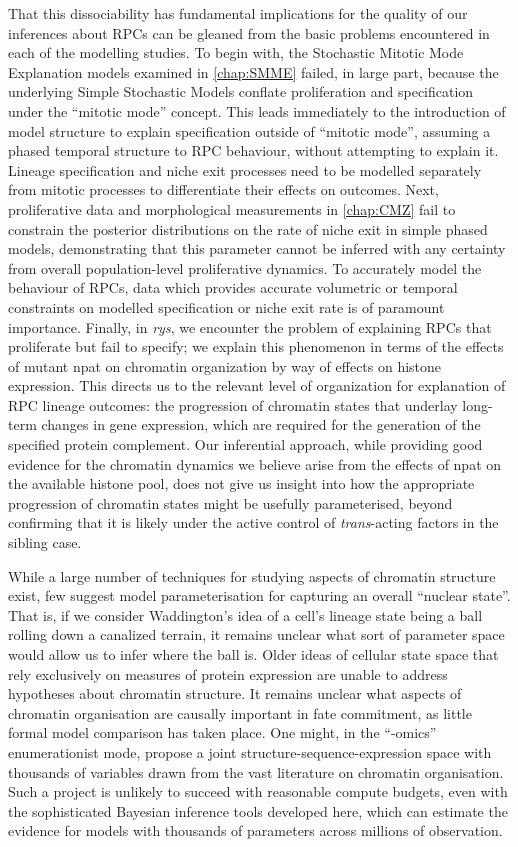 That this dissociability has fundamental implications for the quality of our inferences about RPCs can be gleaned from the basic problems encountered in each of the modelling studies. To begin with, the Stochastic Mitotic Mode Explanation models examined in \autoref{chap:SMME} failed, in large part, because the underlying Simple Stochastic Models conflate proliferation and specification under the ``mitotic mode'' concept. This leads immediately to the introduction of model structure to explain specification outside of ``mitotic mode'', assuming a phased temporal structure to RPC behaviour, without attempting to explain it. Lineage specification and niche exit processes need to be modelled separately from mitotic processes to differentiate their effects on outcomes. Next, proliferative data and morphological measurements in \autoref{chap:CMZ} fail to constrain the posterior distributions on the rate of niche exit in simple phased models, demonstrating that this parameter cannot be inferred with any certainty from overall population-level proliferative dynamics. To accurately model the behaviour of RPCs, data which provides accurate volumetric or temporal constraints on modelled specification or niche exit rate is of paramount importance. Finally, in \textit{rys}, we encounter the problem of explaining RPCs that proliferate but fail to specify; we explain this phenomenon in terms of the effects of mutant npat on chromatin organization by way of effects on histone expression. This directs us to the relevant level of organization for explanation of RPC lineage outcomes: the progression of chromatin states that underlay long-term changes in gene expression, which are required for the generation of the specified protein complement. Our inferential approach, while providing good evidence for the chromatin dynamics we believe arise from the effects of npat on the available histone pool, does not give us insight into how the appropriate progression of chromatin states might be usefully parameterised, beyond confirming that it is likely under the active control of \textit{trans}-acting factors in the sibling case.

While a large number of techniques for studying aspects of chromatin structure exist, few suggest model parameterisation for capturing an overall ``nuclear state''. That is, if we consider Waddington's idea of a cell's lineage state being a ball rolling down a canalized terrain, it remains unclear what sort of parameter space would allow us to infer where the ball is. Older ideas of cellular state space that rely exclusively on measures of protein expression are unable to address hypotheses about chromatin structure. It remains unclear what aspects of chromatin organisation are causally important in fate commitment, as little formal model comparison has taken place. One might, in the ``-omics'' enumerationist mode, propose a joint structure-sequence-expression space with thousands of variables drawn from the vast literature on chromatin organisation. Such a project is unlikely to succeed with reasonable compute budgets, even with the sophisticated Bayesian inference tools developed here, which can estimate the evidence for models with thousands of parameters across millions of observation.

